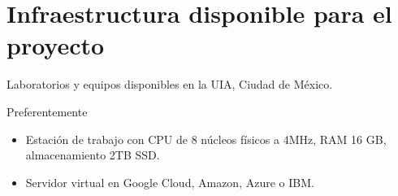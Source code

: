 \section {Infraestructura disponible para el proyecto}
Laboratorios y equipos disponibles en la UIA, Ciudad de México.

Preferentemente\begin{itemize}
\item Estación de trabajo con CPU de 8 núcleos físicos a 4MHz, RAM 16 GB, almacenamiento 2TB SSD.
\item Servidor virtual en Google Cloud, Amazon, Azure o IBM.
\end{itemize}